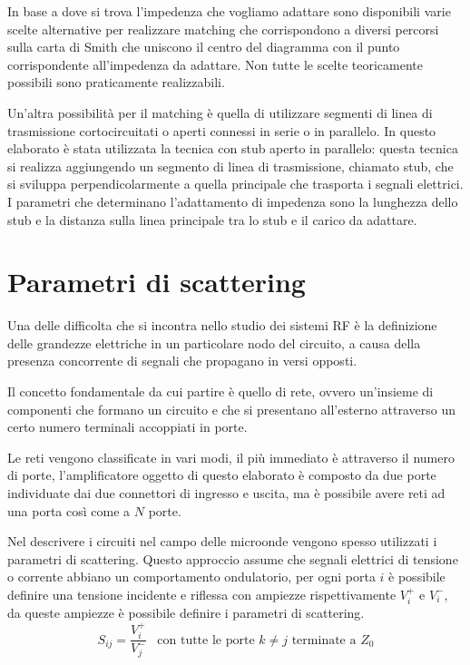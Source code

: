 \documentclass[12pt,oneside]{book}
\begin{document}
In base a dove si trova l'impedenza che vogliamo adattare sono disponibili varie scelte alternative per realizzare matching che corrispondono a diversi percorsi sulla carta di Smith che uniscono il centro del diagramma con il punto corrispondente all'impedenza da adattare. Non tutte le scelte teoricamente possibili sono praticamente realizzabili.

Un'altra possibilità per il matching è quella di utilizzare segmenti di linea di trasmissione cortocircuitati o aperti connessi in serie o in parallelo. In questo elaborato è stata utilizzata la tecnica con stub aperto in parallelo: questa tecnica si realizza aggiungendo un segmento di linea di trasmissione, chiamato stub, che si sviluppa perpendicolarmente a quella principale che trasporta i segnali elettrici. I parametri che determinano l'adattamento di impedenza sono la lunghezza dello stub e la distanza sulla linea principale tra lo stub e il carico da adattare.




\section{Parametri di scattering}
Una delle difficolta che si incontra nello studio dei sistemi RF è la definizione delle grandezze elettriche in un particolare nodo del circuito, a causa della presenza concorrente di segnali che propagano in versi opposti.

Il concetto fondamentale da cui partire è quello di rete, ovvero un'insieme di componenti che formano un circuito e che si presentano all'esterno attraverso un certo numero terminali accoppiati in porte.

Le reti vengono classificate in vari modi, il più immediato è attraverso il numero di porte, l'amplificatore oggetto di questo elaborato è composto da due porte individuate dai due connettori di ingresso e uscita, ma è possibile avere reti ad una porta così come a $N$ porte.


Nel descrivere i circuiti nel campo delle microonde vengono spesso utilizzati i parametri di scattering. Questo approccio assume che segnali elettrici di tensione o corrente abbiano un comportamento ondulatorio, per ogni porta $i$ è possibile definire una tensione incidente e riflessa con ampiezze rispettivamente $V_{i}^{+}$ e $V_{i}^{-}$, da queste ampiezze è possibile definire i parametri di scattering.
\begin{equation}
    S_{ij} = \dfrac{V_{i}^{+}}{V_{j}^{-}} \hspace{10pt} \text{con tutte le porte $k \neq j$ terminate a $Z_0$}
\end{equation}
\end{document}
